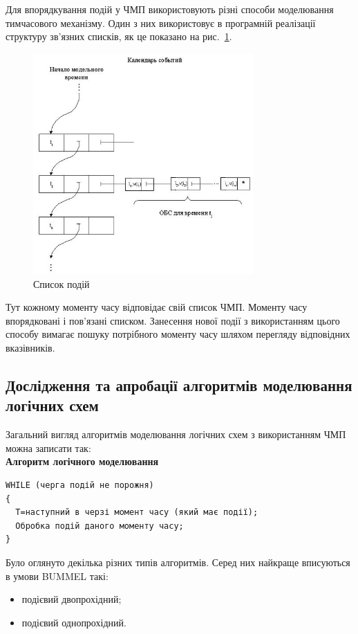 \documentclass[12pt,a4paper]{article}
\begin{document}
Для впорядкування подій у ЧМП використовують різні способи моделювання тимчасового механізму. Один з них використовує в програмній реалізації структуру зв'язних списків, як це показано на рис.~\ref{feqCalendar}.

\begin{figure}[h]
  \centering
    \includegraphics[width=0.75\textwidth]{05_02.jpg}
  \caption{Список подій}\label{feqCalendar}
\end{figure}

Тут кожному моменту часу відповідає свій список ЧМП. Моменту часу впорядковані і пов'язані списком. Занесення нової події з використанням цього способу вимагає пошуку потрібного моменту часу шляхом перегляду відповідних вказівників.

\subsection{Дослідження та апробації алгоритмів моделювання логічних схем}

Загальний вигляд алгоритмів моделювання логічних схем з використанням ЧМП можна записати так:\\
\textbf{Алгоритм логічного моделювання}
\small\begin{verbatim}
WHILE (черга подій не порожня)
{
  T=наступний в черзі момент часу (який має події);
  Обробка подій даного моменту часу;
}
\end{verbatim}\normalsize

Було оглянуто декілька різних типів алгоритмів. Серед них найкраще вписуються в умови BUMMEL такі:
\begin{itemize}
  \item подієвий двопрохідний;
  \item подієвий однопрохідний.
\end{itemize}
\end{document}
